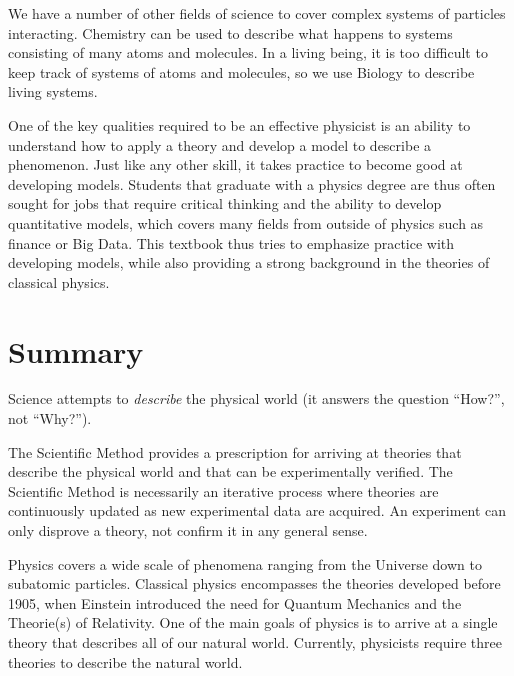 We have a number of other fields of science to cover complex systems of particles interacting. Chemistry can be used to describe what happens to systems consisting of many atoms and molecules. In a living being, it is too difficult to keep track of systems of atoms and molecules, so we use Biology to describe living systems. 

One of the key qualities required to be an effective physicist is an ability to understand how to apply a theory and develop a model to describe a phenomenon. Just like any other skill, it takes practice to become good at developing models. Students that graduate with a physics degree are thus often sought for jobs that require critical thinking and the ability to develop quantitative models, which covers many fields from outside of physics such as finance or Big Data. This textbook thus tries to emphasize practice with developing models, while also providing a strong background in the theories of classical physics. 

\newpage
\section{Summary}
\vspace{0.5cm}
\begin{chapterSummary}
Science attempts to \textit{describe} the physical world (it answers the question ``How?'', not ``Why?''). 

The Scientific Method provides a prescription for arriving at theories that describe the physical world and that can be experimentally verified. The Scientific Method is necessarily an iterative process where theories are continuously updated as new experimental data are acquired. An experiment can only disprove a theory, not confirm it in any general sense.

Physics covers a wide scale of phenomena ranging from the Universe down to subatomic particles. Classical physics encompasses the theories developed before 1905, when Einstein introduced the need for Quantum Mechanics and the Theorie(s) of Relativity. One of the main goals of physics is to arrive at a single theory that describes all of our natural world. Currently, physicists require three theories to describe the natural world.

\end{chapterSummary}

